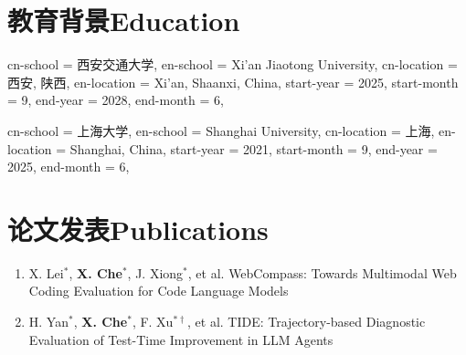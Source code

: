 \documentclass{resume}
\begin{document}


\section{\iflangcn 教育背景\else Education\fi}

\begin{education}{
  cn-school   = {西安交通大学},
  en-school   = {Xi'an Jiaotong University},
  cn-location = {西安, 陕西},
  en-location = {Xi'an, Shaanxi, China},
  start-year  = 2025, start-month = 9,
  end-year    = 2028, end-month   = 6,
}
\end{education}

\begin{education}{
  cn-school   = {上海大学},
  en-school   = {Shanghai University},
  cn-location = {上海},
  en-location = {Shanghai, China},
  start-year  = 2021, start-month = 9,
  end-year    = 2025, end-month   = 6,
}
\end{education}

\section{\iflangcn 论文发表\else Publications\fi}
\begin{enumerate}
  \item {}%
    {X. Lei$^*$, \textcolor[HTML]{CC7260}{\textbf{X. Che$^*$}}, J. Xiong$^*$, et al.}%
    {WebCompass: Towards Multimodal Web Coding Evaluation for Code Language Models}
  \item {}%
    {H. Yan$^*$, \textcolor[HTML]{CC7260}{\textbf{X. Che$^*$}}, F. Xu$^{*\dagger}$, et al.}%
    {TIDE: Trajectory-based Diagnostic Evaluation of Test-Time Improvement in LLM Agents}
\end{enumerate}

\end{document}
